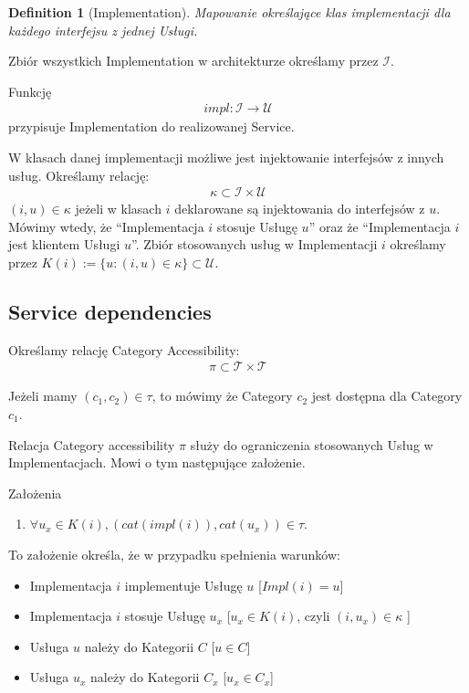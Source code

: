 \documentclass[a4paper,10pt]{article}
\newtheorem{defi}{Definition}[section]
\begin{document}
\begin{defi}[Implementation]
  Mapowanie określające klas implementacji dla każdego interfejsu z jednej Usługi.
\end{defi}

Zbiór wszystkich Implementation w architekturze określamy przez $\mathcal{I}$. 

Funkcję 
\begin{eqnarray}
 impl: \mathcal{I}  \rightarrow \mathcal{U}
\end{eqnarray}
 przypisuje Implementation do realizowanej Service.

W klasach danej implementacji możliwe jest injektowanie interfejsów z innych usług. Określamy relację:
\begin{eqnarray}
\kappa \subset \mathcal{I} \times \mathcal{U}
\end{eqnarray}
$(i,u) \in \kappa$ jeżeli w klasach $i$ deklarowane są injektowania do interfejsów z $u$. Mówimy wtedy, że ``Implementacja $i$ stosuje Usługę $u$'' oraz że ``Implementacja $i$ jest klientem Usługi $u$''. Zbiór stosowanych usług w Implementacji $i$ określamy przez $K(i) := \{ u : (i,u)\in \kappa \} \subset \mathcal{U}$.


\subsection{Service dependencies}

Określamy relację Category Accessibility:
\begin{eqnarray}
\pi \subset \mathcal{T} \times \mathcal{T}
\end{eqnarray}

Jeżeli mamy $(c_1,c_2) \in \tau$, to mówimy że Category $c_2$ jest dostępna dla Category $c_1$.

Relacja Category accessibility $\pi$ służy do ograniczenia stosowanych Usług w Implementacjach. Mowi o tym następujące założenie.

Założenia
\begin{enumerate}
 \item $ \forall u_x \in K(i),  (cat(impl(i)),cat(u_x)) \in \tau$.
\end{enumerate}


To założenie określa, że w przypadku spełnienia warunków:
\begin{itemize}
\item Implementacja $i$ implementuje Usługę $u$ [$Impl(i) = u $]
\item Implementacja $i$ stosuje Usługę $u_x$ [$ u_x \in K(i)$, czyli $(i,u_x)\in\kappa$ ]
\item Usługa $u$ należy do Kategorii $C$ [$u\in C$]
\item Usługa $u_x$ należy do Kategorii $C_x$ [$u_x\in C_x$]
\end{itemize}
\end{document}
